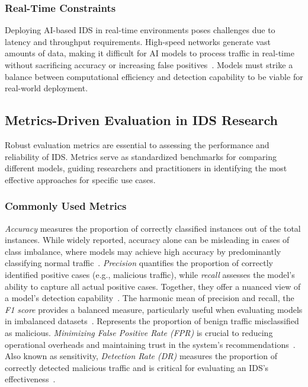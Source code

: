 \subsubsection{Real-Time Constraints} Deploying AI-based IDS in real-time environments poses challenges due to latency and throughput requirements. High-speed networks generate vast amounts of data, making it difficult for AI models to process traffic in real-time without sacrificing accuracy or increasing false positives~\cite{Ghadermazi2024}. Models must strike a balance between computational efficiency and detection capability to be viable for real-world deployment.




\subsection{Metrics-Driven Evaluation in IDS Research}
Robust evaluation metrics are essential to assessing the performance and reliability of IDS. Metrics serve as standardized benchmarks for comparing different models, guiding researchers and practitioners in identifying the most effective approaches for specific use cases.

\subsubsection{Commonly Used Metrics} \emph{Accuracy} measures the proportion of correctly classified instances out of the total instances. While widely reported, accuracy alone can be misleading in cases of class imbalance, where models may achieve high accuracy by predominantly classifying normal traffic~\cite{Islam2023}. \emph{Precision} quantifies the proportion of correctly identified positive cases (e.g., malicious traffic), while \emph{recall} assesses the model's ability to capture all actual positive cases. Together, they offer a nuanced view of a model's detection capability~\cite{Jayalaxmi2022}. The harmonic mean of precision and recall, the \emph{F1 score} provides a balanced measure, particularly useful when evaluating models in imbalanced datasets~\cite{Gutierrez2023}. Represents the proportion of benign traffic misclassified as malicious. \emph{Minimizing False Positive Rate (FPR)} is crucial to reducing operational overheads and maintaining trust in the system's recommendations~\cite{vinayakumar2019deep}. Also known as sensitivity, \emph{Detection Rate (DR)} measures the proportion of correctly detected malicious traffic and is critical for evaluating an IDS's effectiveness~\cite{Meena2021}.

